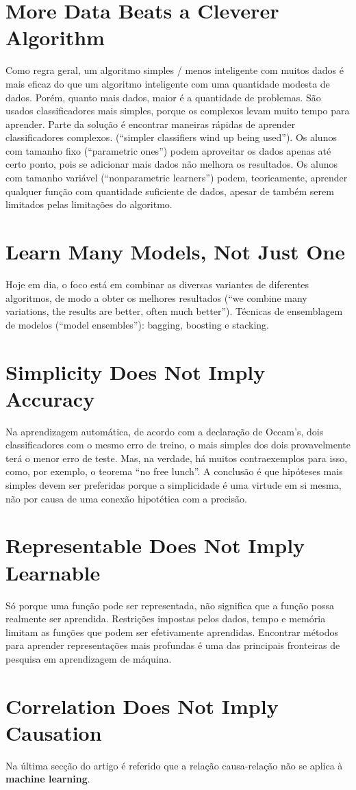 \documentclass{article}
\begin{document}
\section{More Data Beats a Cleverer Algorithm}
Como regra geral, um algoritmo simples / menos inteligente com muitos dados é mais eficaz
do que um algoritmo inteligente com uma quantidade modesta de dados. Porém, quanto mais
dados, maior é a quantidade de problemas.
São usados classificadores mais simples, porque os complexos levam muito tempo para
aprender. Parte da solução é encontrar maneiras rápidas de aprender classificadores
complexos. (“simpler classifiers wind up being used”).
Os alunos com tamanho fixo (“parametric ones”) podem aproveitar os dados apenas até certo
ponto, pois se adicionar mais dados não melhora os resultados. Os alunos com tamanho
variável (“nonparametric learners”) podem, teoricamente, aprender qualquer função com
quantidade suficiente de dados, apesar de também serem limitados pelas limitações do algoritmo.

\section{Learn Many Models, Not Just One}
Hoje em dia, o foco está em combinar as diversas variantes de diferentes algoritmos, de modo
a obter os melhores resultados (“we combine many variations, the results are better, often
much better”). Técnicas de ensemblagem de modelos (“model ensembles”): bagging, boosting
e stacking.

\section{Simplicity Does Not Imply Accuracy}
Na aprendizagem automática, de acordo com a declaração de Occam’s, dois classificadores
com o mesmo erro de treino, o mais simples dos dois provavelmente terá o menor erro de
teste. Mas, na verdade, há muitos contraexemplos para isso, como, por exemplo, o teorema
“no free lunch”.
A conclusão é que hipóteses mais simples devem ser preferidas porque a simplicidade é uma
virtude em si mesma, não por causa de uma conexão hipotética com a precisão.

\section{Representable Does Not Imply Learnable}
Só porque uma função pode ser representada, não significa que a função possa realmente ser
aprendida. Restrições impostas pelos dados, tempo e memória limitam as funções que podem
ser efetivamente aprendidas.
Encontrar métodos para aprender representações mais profundas é uma das principais
fronteiras de pesquisa em aprendizagem de máquina.

\section{Correlation Does Not Imply Causation}
Na última secção do artigo é referido que a relação causa-relação não se aplica à \textbf{machine learning}. 
\end{document}
